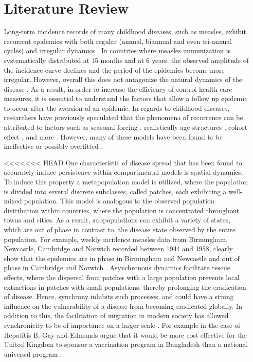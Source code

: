 \documentclass[twocolumn,nofootinbib,showkeys,twoside,floatfix,unsortedaddress,flushbottom,10pt,aps,pra]{report}
\begin{document}
\section{Literature Review }
Long-term incidence records of many childhood diseases, such as measles, exhibit recurrent epidemics with both regular (annual, biannual and even tri-annual cycles) and irregular dynamics \cite{Earn2000}. In countries where measles immunization is systematically distributed at 15 months and at 6 years, the observed amplitude of the incidence curve declines and the period of the epidemics become more irregular. However, overall this does not antagonize the natural dynamics of the disease \cite{Samanta2014,Earn2000}. As a result, in order to increase the efficiency of control health care measures, it is essential to understand the factors that allow a follow up epidemic to occur after the aversion of an epidemic. In regards to childhood diseases, researchers have previously speculated that the phenomena of recurrence can be attributed to factors such as seasonal forcing \cite{olsen1990chaos}, realistically age-structures \cite{schenzle1984age}, cohort effect \cite{taylor1999autism}, and more \cite{Lloyd1996}. However, many of these models have been found to be ineffective or possibly overfitted \cite{Lloyd1996}. 
\par
\smallskip \qquad
<<<<<<< HEAD
One characteristic of disease spread that has been found to accurately induce persistence within compartmental models is spatial dynamics. To induce this property a metapopulation model is utilized, where the population is divided into several discrete subclasses, called patches, each exhibiting a well-mixed population. This model is analogous to the observed population distribution within countries, where the population is concentrated throughout towns and cities. As a result, subpopulations can exhibit a variety of states, which are out of phase in contrast to, the disease state observed by the entire population. For example, weekly incidence measles data from Birmingham, Newcastle, Cambridge and Norwich recorded between 1944 and 1958, clearly show that the epidemics are in phase in Birmingham and Newcastle and out of phase in Cambridge and Norwich \cite{Grenfell2001}. Asynchronous dynamics facilitate rescue effects, where the dispersal from patches with a large population prevents local extinctions in patches with small populations, thereby prolonging the eradication of disease. Hence, synchrony inhibits such processes, and could have a strong influence on the vulnerability of a disease from becoming eradicated globally. In addition to this, the facilitation of migration in modern society has allowed synchronicity to be of importance on a larger scale \cite{McCluskey2011}. For example in the case of Hepatitis B, Gay and Edmunds argue that it would be more cost effective for the United Kingdom to sponsor a vaccination program in Bangladesh than a national universal program \cite{Burton2012}. 
\end{document}
